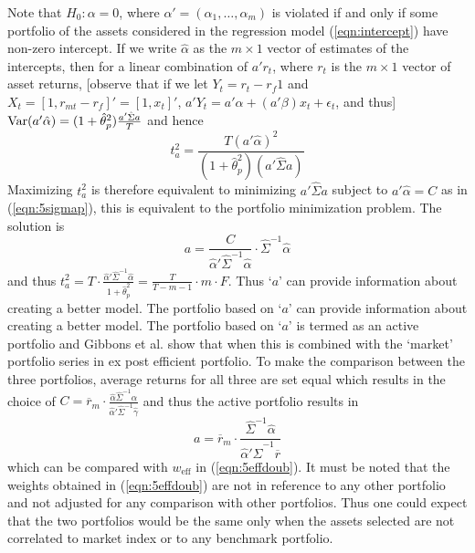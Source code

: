 	
Note that $H_0: \alpha=0$, where $\alpha'=(\alpha_1,\ldots,\alpha_m)$ is violated if and only if some portfolio of the assets considered in the regression model (\ref{eqn:intercept}) have non-zero intercept. If we write $\hat{\alpha}$ as the $m\times 1$ vector of estimates of the intercepts, then for a linear combination of $a'r_t$, where $r_t$ is the $m \times 1$ vector of asset returns, [observe that if we let $Y_t=r_t-r_f1$ and $X_t=[1,r_{mt}-r_f]'=[1,x_t]'$, $a'Y_t=a' \alpha + (a'\beta) x_t + \epsilon_t$, and thus] $\operatorname{Var}(a'\hat{\alpha})= (1+\hat{\theta}_p^2) \frac{a' \hat{\Sigma}a}{T}$ and hence
	\begin{equation}\label{eqn:smallt}
	t_a^2= \dfrac{T(a'\hat{\alpha})^2}{(1+\hat{\theta}_p^2)(a' \hat{\Sigma} a)}
	\end{equation}
Maximizing $t_a^2$ is therefore equivalent to minimizing $a' \hat{\Sigma}a$ subject to $a'\hat{\alpha}=C$ as in (\ref{eqn:5sigmap}), this is equivalent to the portfolio minimization problem. The solution is
	\begin{equation}\label{eqn:5a}
	a= \dfrac{C}{\hat{\alpha}' \hat{\Sigma}^{-1} \hat{\alpha}} \cdot \hat{\Sigma}^{-1} \hat{\alpha}
	\end{equation}
and thus $t_a^2= T \cdot \frac{\hat{\alpha}' \hat{\Sigma}^{-1} \hat{\alpha}}{1+\hat{\theta}_p^2}= \frac{T}{T-m-1} \cdot m \cdot F$. Thus `$a$' can provide information about creating a better model. The portfolio based on `$a$' can provide information about creating a better model. The portfolio based on `$a$' is termed as an active portfolio and Gibbons et al. show that when this is combined with the `market' portfolio series in ex post efficient portfolio. To make the comparison between the three portfolios, average returns for all three are set equal which results in the choice of $C=\overline{r}_m \cdot \frac{\hat{\alpha} \hat{\Sigma}^{-1} \hat{\alpha}}{\hat{\alpha}' \hat{\Sigma}^{-1} \hat{\gamma}}$ and thus the active portfolio results in 
	\begin{equation}\label{eqn:5a2}
	a= \overline{r}_m \cdot \dfrac{\hat{\Sigma}^{-1} \hat{\alpha}}{\hat{\alpha}' \hat{\Sigma}^{-1} \overline{r}}
	\end{equation}	
which can be compared with $w_{\text{eff}}$ in (\ref{eqn:5effdoub}). It must be noted that the weights obtained in (\ref{eqn:5effdoub}) are not in reference to any other portfolio and not adjusted for any comparison with other portfolios. Thus one could expect that the two portfolios would be the same only when the assets selected are not correlated to market index or to any benchmark portfolio. 


